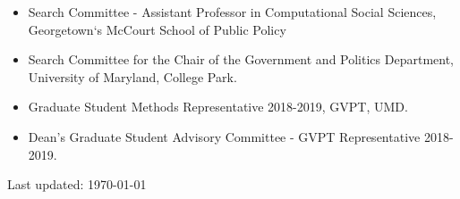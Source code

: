 \documentclass[letterpaper, 11pt]{article}
\begin{document}
    \begin{itemize}[leftmargin=.45cm]

            \item Search Committee - Assistant Professor in Computational Social Sciences, Georgetown`s McCourt School of  Public Policy
            \item Search Committee for the Chair of the Government and Politics Department, University of Maryland, College Park.
        \item Graduate Student Methods Representative 2018-2019, GVPT, UMD.
        \item Dean's Graduate Student Advisory Committee - GVPT Representative 2018-2019.
    \end{itemize}





    \bigskip

    \begin{center}
        \begin{footnotesize}
            Last updated: \today
        \end{footnotesize}
    \end{center}
\end{document}
